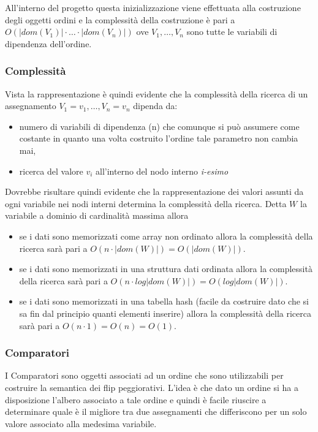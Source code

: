 All'interno del progetto questa inizializzazione viene effettuata alla
costruzione degli oggetti ordini e la complessità della costruzione è
pari a $O(|dom(V_1)| \cdot \dots \cdot |dom(V_n)|)$ ove $ V_1, \dots,
V_n $ sono tutte le variabili di dipendenza dell'ordine.

\subsubsection{Complessità}
Vista la rappresentazione è quindi evidente che la complessità della
ricerca di un assegnamento $ V_1=v_1, \dots, V_n=v_n $ dipenda da:

\begin{itemize}
\item numero di variabili di dipendenza (n) che comunque si può
  assumere come costante in quanto una volta costruito l'ordine tale
  parametro non cambia mai,
\item ricerca del valore $v_i$ all'interno del nodo interno
  \textit{i-esimo}
\end{itemize}

Dovrebbe risultare quindi evidente che la rappresentazione dei valori
assunti da ogni variabile nei nodi interni determina la complessità
della ricerca. Detta $W$ la variabile a dominio di cardinalità massima
allora
\begin{itemize}
\item se i dati sono memorizzati come array non ordinato allora la
  complessità della ricerca sarà pari a $O(n \cdot
  |dom(W)|)=O(|dom(W)|)$.
\item se i dati sono memorizzati in una struttura dati ordinata allora
  la complessità della ricerca sarà pari a $O(n \cdot
  log|dom(W)|)=O(log|dom(W)|)$.
\item se i dati sono memorizzati in una tabella hash (facile da
  costruire dato che si sa fin dal principio quanti elementi inserire)
  allora la complessità della ricerca sarà pari a $O(n \cdot
  1)=O(n)=O(1)$.
\end{itemize}

\subsubsection{Comparatori}
\label{sect:comparatori}
I Comparatori sono oggetti associati ad un ordine che sono
utilizzabili per costruire la semantica dei flip peggiorativi. L'idea
è che dato un ordine si ha a disposizione l'albero associato a tale
ordine e quindi è facile riuscire a determinare quale è il migliore
tra due assegnamenti che differiscono per un solo valore associato
alla medesima variabile.

